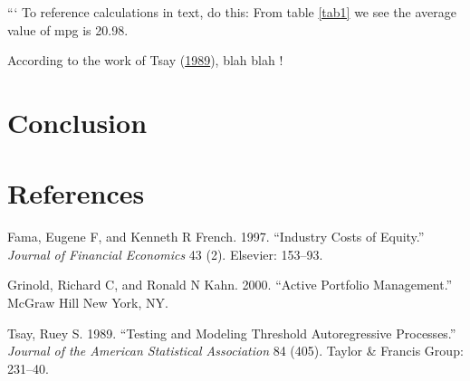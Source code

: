 \documentclass[11pt,preprint, authoryear]{elsarticle}
\numberwithin{equation}{section}
\numberwithin{figure}{section}
\numberwithin{table}{section}
\begin{document}
``` To reference calculations in text, do this: From table \ref{tab1} we
see the average value of mpg is 20.98.

According to the work of Tsay (\protect\hyperlink{ref-Tsay1989}{1989}),
blah blah !

\section{Conclusion}\label{conclusion}

\section*{References}\label{references}

\hypertarget{refs}{}
\hypertarget{ref-fama1997}{}
Fama, Eugene F, and Kenneth R French. 1997. ``Industry Costs of
Equity.'' \emph{Journal of Financial Economics} 43 (2). Elsevier:
153--93.

\hypertarget{ref-grinold2000}{}
Grinold, Richard C, and Ronald N Kahn. 2000. ``Active Portfolio
Management.'' McGraw Hill New York, NY.

\hypertarget{ref-Tsay1989}{}
Tsay, Ruey S. 1989. ``Testing and Modeling Threshold Autoregressive
Processes.'' \emph{Journal of the American Statistical Association} 84
(405). Taylor \& Francis Group: 231--40.




\end{document}
